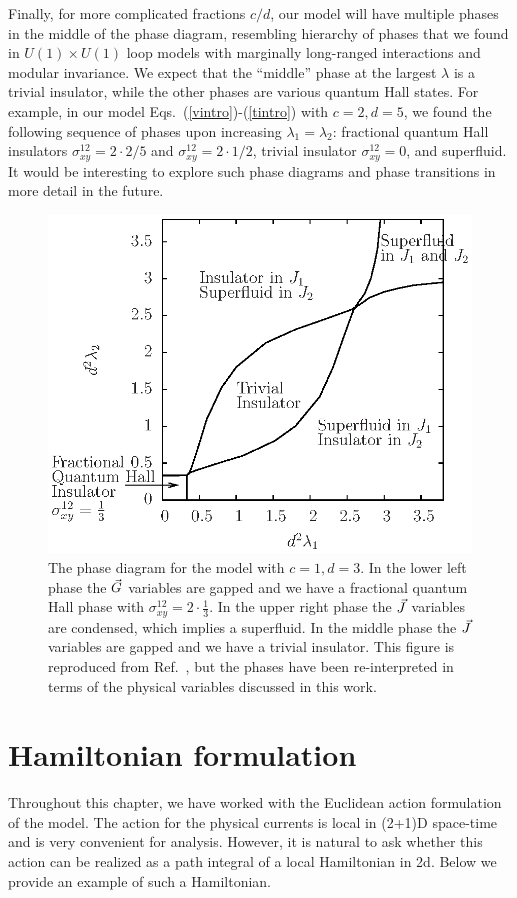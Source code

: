 Finally, for more complicated fractions $c/d$, our model will have multiple phases in the middle of the phase diagram, resembling hierarchy of phases that we found in $U(1) \times U(1)$ loop models with marginally long-ranged interactions and modular invariance.\cite{Gen2Loops}  We expect that the ``middle'' phase at the largest $\lambda$ is a trivial insulator, while the other phases are various quantum Hall states.  For example, in our model Eqs.~(\ref{vintro})-(\ref{tintro}) with $c=2, d=5$, we found the following sequence of phases upon increasing $\lambda_1 = \lambda_2$: fractional quantum Hall insulators $\sigma^{12}_{xy} = 2\cdot 2/5$ and $\sigma^{12}_{xy} = 2\cdot 1/2$, trivial insulator $\sigma^{12}_{xy} = 0$, and superfluid.  It would be interesting to explore such phase diagrams and phase transitions in more detail in the future.

\begin{figure}
\includegraphics[width=0.6\linewidth]{figures/fracphase.eps}
\caption{The phase diagram for the model with $c=1,d=3$. In the lower left phase the $\vec{G}$ variables are gapped and we have a fractional quantum Hall phase with $\sigma^{12}_{xy}=2\cdot\frac{1}{3}$. In the upper right phase the $\vec{J}$ variables are condensed, which implies a superfluid. In the middle phase the $\vec{J}$ variables are gapped and we have a trivial insulator. This figure is reproduced from Ref.~\cite{short_range3}, but the phases have been re-interpreted in terms of the physical variables discussed in this work.}
\label{fracphase}
\end{figure}


\section{Hamiltonian formulation}
\label{section::H}
Throughout this chapter, we have worked with the Euclidean action formulation of the model.  The action for the physical currents is local in (2+1)D space-time and is very convenient for analysis.  However, it is natural to ask whether this action can be realized as a path integral of a local Hamiltonian in 2d.\cite{Matthew_Alexei_thanks}  Below we provide an example of such a Hamiltonian.

